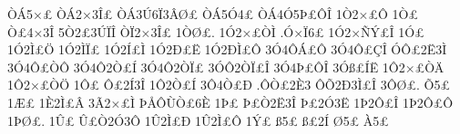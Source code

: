 {^^d2^^c15^^d7^^a3
^^d2^^c12^^d73^^ce^^a3
^^d2^^c13^^da6^^cf3^^c2^^d8^^a3
^^d2^^c15^^d34^^a3
^^d2^^c14^^d35^^de^^a3^^d4^^ce
1^^d22^^d7^^a3^^d4
1^^d2^^a3
^^d2^^a34^^d73^^ce
5^^d22^^a33^^da^^cf^^ce
^^d2^^cf2^^d73^^ce^^a3
1^^d2^^d8^^a3.
1^^d32^^d7^^a3^^d2^^cc
.^^d3^^d7^^cf6^^a3
1^^d32^^d7^^d1^^dd^^a3^^ce
1^^d3^^a3
1^^d32^^cc^^a3^^d6
1^^d32^^cc^^cf^^a3
1^^d32^^cd^^a3^^cc
1^^d32^^d0^^a3^^cb
1^^d32^^d0^^cc^^a3^^d4
3^^d34^^d4^^c1^^a3^^d4
3^^d34^^d4^^a3^^c7^^ce
^^d3^^d4^^a32^^cb3^^cc
3^^d34^^d4^^a3^^d2^^d4
3^^d34^^d42^^d2^^a3^^cd
3^^d34^^d42^^d2^^cf^^a3
3^^d3^^d42^^d2^^cf^^a3^^ce
3^^d34^^de^^a3^^d4^^ce
3^^d3^^df^^a3^^cd^^cb
1^^d42^^d7^^a3^^d2^^c4
1^^d42^^d7^^a3^^d2^^d6
1^^d4^^a3
^^d4^^a32^^cd3^^ce
1^^d42^^d2^^a3^^cd
3^^d44^^d2^^a3^^d0
.^^d4^^d2^^a32^^c83
^^d4^^d52^^d03^^cc^^a3^^ce
3^^d4^^d8^^a3.
^^d55^^a3
1^^c6^^a3
1^^c82^^cc^^a3^^c2
3^^c32^^d7^^a3^^cc
^^de^^c5^^d4^^d9^^d2^^a36^^c8
1^^de^^a3
^^de^^a3^^d22^^cb3^^ce
^^de^^a32^^d33^^cb
1^^de2^^d4^^a3^^ce
1^^de2^^d4^^a3^^d4
1^^de^^d8^^a3.
1^^db^^a3
^^db^^a3^^d22^^d33^^d4
1^^db2^^cc^^a3^^d0
1^^db2^^cc^^a3^^d4
1^^dd^^a3
^^df5^^a3
^^df^^a32^^cd
^^d85^^a3
^^c05^^a3
}
